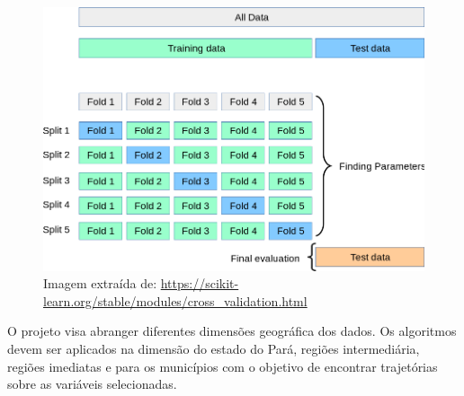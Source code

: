 \begin{figure}[hbt!]
    \centering
    \includegraphics[width=0.8\columnwidth]{src/grid_search_cross_validation.png}
    \centering
    \caption{Imagem extraída de: \url{https://scikit-learn.org/stable/modules/cross_validation.html}}
    \label{fig:cross_validation}
\end{figure}

O projeto visa abranger diferentes dimensões geográfica dos dados. Os algoritmos devem ser aplicados na dimensão do estado do Pará, regiões intermediária, regiões imediatas e para os municípios com o objetivo de encontrar trajetórias sobre as variáveis selecionadas.